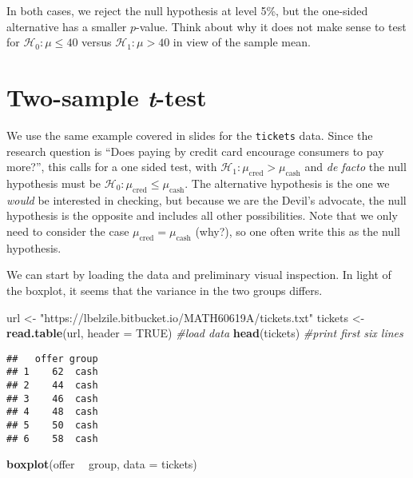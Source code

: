 \documentclass[
]{book}
\newenvironment{Shaded}{\begin{snugshade}}{\end{snugshade}}
\newcommand{\CommentTok}[1]{\textcolor[rgb]{0.56,0.35,0.01}{\textit{#1}}}
\newcommand{\DataTypeTok}[1]{\textcolor[rgb]{0.13,0.29,0.53}{#1}}
\newcommand{\KeywordTok}[1]{\textcolor[rgb]{0.13,0.29,0.53}{\textbf{#1}}}
\newcommand{\NormalTok}[1]{#1}
\newcommand{\OperatorTok}[1]{\textcolor[rgb]{0.81,0.36,0.00}{\textbf{#1}}}
\newcommand{\OtherTok}[1]{\textcolor[rgb]{0.56,0.35,0.01}{#1}}
\newcommand{\StringTok}[1]{\textcolor[rgb]{0.31,0.60,0.02}{#1}}
\begin{document}
In both cases, we reject the null hypothesis at level 5\%, but the one-sided alternative has a smaller \(p\)-value. Think about why it does not make sense to test for \(\mathscr{H}_0: \mu \leq 40\) versus \(\mathscr{H}_1: \mu >40\) in view of the sample mean.

\hypertarget{two-sample-t-test}{%
\section{\texorpdfstring{Two-sample \emph{t}-test}{Two-sample t-test}}\label{two-sample-t-test}}

We use the same example covered in slides for the \texttt{tickets} data. Since the research question is ``Does paying by credit card encourage consumers to pay more?'', this calls for a one sided test, with \(\mathscr{H}_1: \mu_{\text{cred}} > \mu_{\text{cash}}\) and \emph{de facto} the null hypothesis must be \(\mathscr{H}_0: \mu_{\text{cred}} \leq \mu_{\text{cash}}\). The alternative hypothesis is the one we \emph{would} be interested in checking, but because we are the Devil's advocate, the null hypothesis is the opposite and includes all other possibilities. Note that we only need to consider the case \(\mu_{\text{cred}} = \mu_{\text{cash}}\) (why?), so one often write this as the null hypothesis.

We can start by loading the data and preliminary visual inspection. In light of the boxplot, it seems that the variance in the two groups differs.

\begin{Shaded}
\begin{Highlighting}[]
\NormalTok{url <-}\StringTok{ "https://lbelzile.bitbucket.io/MATH60619A/tickets.txt"}
\NormalTok{tickets <-}\StringTok{ }\KeywordTok{read.table}\NormalTok{(url, }\DataTypeTok{header =} \OtherTok{TRUE}\NormalTok{) }\CommentTok{#load data}
\KeywordTok{head}\NormalTok{(tickets) }\CommentTok{#print first six lines}
\end{Highlighting}
\end{Shaded}

\begin{verbatim}
##   offer group
## 1    62  cash
## 2    44  cash
## 3    46  cash
## 4    48  cash
## 5    50  cash
## 6    58  cash
\end{verbatim}

\begin{Shaded}
\begin{Highlighting}[]
\KeywordTok{boxplot}\NormalTok{(offer }\OperatorTok{~}\StringTok{ }\NormalTok{group, }\DataTypeTok{data =}\NormalTok{ tickets)}
\end{Highlighting}
\end{Shaded}
\end{document}
